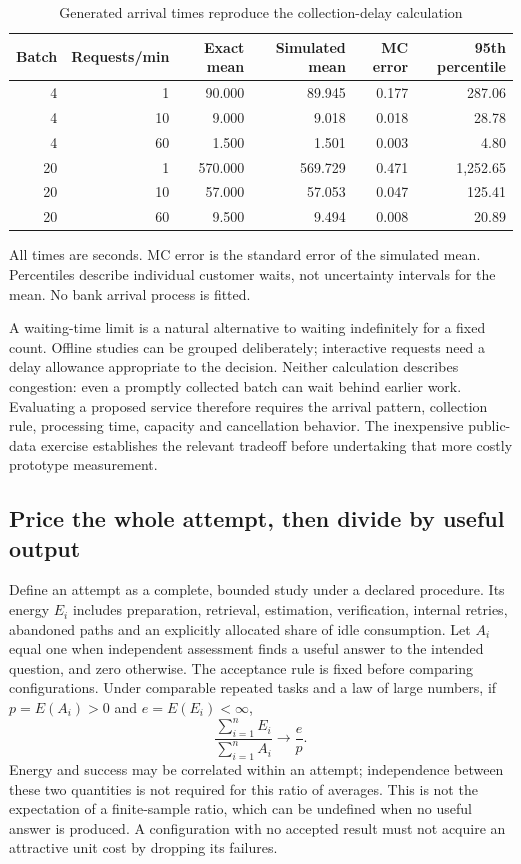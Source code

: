 \begin{table}[htbp]
\centering\small
\caption{Generated arrival times reproduce the collection-delay calculation}
\label{closure:batch-results}
\begin{tabular}{rrrrrr}
\toprule
Batch & Requests/min & Exact mean & Simulated mean & MC error & 95th percentile\\
\midrule
4&1&90.000&89.945&0.177&287.06\\
4&10&9.000&9.018&0.018&28.78\\
4&60&1.500&1.501&0.003&4.80\\
20&1&570.000&569.729&0.471&1,252.65\\
20&10&57.000&57.053&0.047&125.41\\
20&60&9.500&9.494&0.008&20.89\\
\bottomrule
\end{tabular}
\par\smallskip\footnotesize All times are seconds. MC error is the standard
error of the simulated mean. Percentiles describe individual customer waits,
not uncertainty intervals for the mean. No bank arrival process is fitted.
\end{table}

A waiting-time limit is a natural alternative to waiting indefinitely for a
fixed count. Offline studies can be grouped deliberately; interactive
requests need a delay allowance appropriate to the decision. Neither
calculation describes congestion: even a promptly collected batch can wait
behind earlier work. Evaluating a proposed service therefore requires the
arrival pattern, collection rule, processing time, capacity and cancellation
behavior. The inexpensive public-data exercise establishes the relevant
tradeoff before undertaking that more costly prototype measurement.

\subsection{Price the whole attempt, then divide by useful output}

Define an attempt as a complete, bounded study under a declared procedure.
Its energy $E_i$ includes preparation, retrieval, estimation, verification,
internal retries, abandoned paths and an explicitly allocated share of
idle consumption. Let $A_i$ equal one when independent assessment finds a
useful answer to the intended question, and zero otherwise. The acceptance
rule is fixed before comparing configurations. Under comparable repeated
tasks and a law of large numbers, if $p=E(A_i)>0$ and $e=E(E_i)<\infty$,
\begin{equation}
 \frac{\sum_{i=1}^n E_i}{\sum_{i=1}^n A_i}
       \longrightarrow \frac{e}{p}.
 \label{closure:energy-useful}
\end{equation}
Energy and success may be correlated within an attempt; independence
between these two quantities is not required for this ratio of averages.
This is not the expectation of a finite-sample ratio, which can be undefined
when no useful answer is produced. A configuration with no accepted result
must not acquire an attractive unit cost by dropping its failures.

